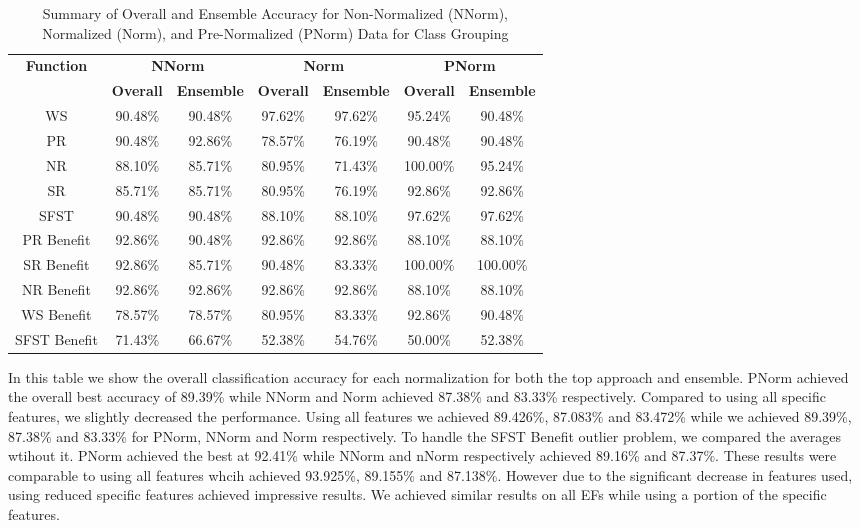\documentclass[12pt,letterpaper]{article}
\begin{document}
\begin{table}[H]
\centering
\begin{tabular}{|c||c|c||c|c||c|c|}
\hline
\multirow{2}{*}{\textbf{Function}} & \multicolumn{2}{c||}{\textbf{NNorm}} & \multicolumn{2}{c||}{\textbf{Norm}} & \multicolumn{2}{c|}{\textbf{PNorm}} \\
\cline{2-7}
 & \textbf{Overall} & \textbf{Ensemble} & \textbf{Overall} & \textbf{Ensemble} & \textbf{Overall} & \textbf{Ensemble} \\
\hline
WS & 90.48\% & 90.48\% & 97.62\% & 97.62\% & 95.24\% & 90.48\% \\
\hline
PR & 90.48\% & 92.86\% & 78.57\% & 76.19\% & 90.48\% & 90.48\% \\
\hline
NR & 88.10\% & 85.71\% & 80.95\% & 71.43\% & 100.00\% & 95.24\% \\
\hline
SR & 85.71\% & 85.71\% & 80.95\% & 76.19\% & 92.86\% & 92.86\% \\
\hline
SFST & 90.48\% & 90.48\% & 88.10\% & 88.10\% & 97.62\% & 97.62\% \\
\hline
PR Benefit & 92.86\% & 90.48\% & 92.86\% & 92.86\% & 88.10\% & 88.10\% \\
\hline
SR Benefit & 92.86\% & 85.71\% & 90.48\% & 83.33\% & 100.00\% & 100.00\% \\
\hline
NR Benefit & 92.86\% & 92.86\% & 92.86\% & 92.86\% & 88.10\% & 88.10\% \\
\hline
WS Benefit & 78.57\% & 78.57\% & 80.95\% & 83.33\% & 92.86\% & 90.48\% \\
\hline
SFST Benefit & 71.43\% & 66.67\% & 52.38\% & 54.76\% & 50.00\% & 52.38\% \\
\hline
\end{tabular}
\caption{Summary of Overall and Ensemble Accuracy for Non-Normalized (NNorm), Normalized (Norm), and Pre-Normalized (PNorm) Data for Class Grouping}
\label{reg_spec_tab:summary_grouping}
\end{table}


In this table we show the overall classification accuracy for each normalization for both the top approach and ensemble.
PNorm achieved the overall best accuracy of 89.39\% while NNorm and Norm achieved 87.38\% and 83.33\% respectively.
Compared to using all specific features, we slightly decreased the performance.
Using all features we achieved 89.426\%, 87.083\% and 83.472\% while we achieved 89.39\%,  87.38\% and 83.33\% for PNorm, NNorm and Norm respectively.
To handle the \ac{SFST} Benefit outlier problem, we compared the averages wtihout it.
PNorm achieved the best at 92.41\% while NNorm and nNorm respectively achieved 89.16\% and 87.37\%.
These results were comparable to using all features whcih achieved 93.925\%, 89.155\% and 87.138\%.
However due to the significant decrease in features used, using reduced specific features achieved impressive results.
We achieved similar results on all \ac{EF}s while using a portion of the specific features.
\end{document}
